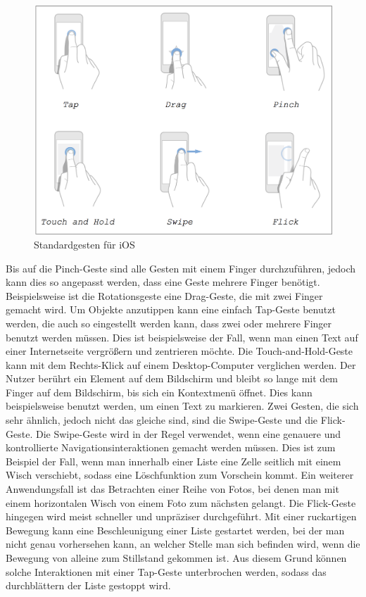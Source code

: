 \documentclass[11pt,a4paper]{report}
\begin{document}
\begin{figure}[h]
\begin{center}
\includegraphics[scale=0.31]{./images/42.png}
\caption{Standardgesten für iOS \cite{appleGesturesStandard}}
\label{applegesten}
\end{center}
\end{figure}Bis auf die Pinch-Geste sind alle Gesten mit einem Finger durchzuführen, jedoch kann dies so angepasst werden, dass eine Geste mehrere Finger benötigt. Beispielsweise ist die Rotationsgeste eine Drag-Geste, die mit zwei Finger gemacht wird. Um Objekte anzutippen kann eine einfach Tap-Geste benutzt werden, die auch so eingestellt werden kann, dass zwei oder mehrere Finger benutzt werden müssen. Dies ist beispielsweise der Fall, wenn man einen Text auf einer Internetseite vergrößern und zentrieren möchte. Die Touch-and-Hold-Geste kann mit dem Rechts-Klick auf einem Desktop-Computer verglichen werden. Der Nutzer berührt ein Element auf dem Bildschirm und bleibt so lange mit dem Finger auf dem Bildschirm, bis sich ein Kontextmenü öffnet. Dies kann beispielsweise benutzt werden, um einen Text zu markieren. Zwei Gesten, die sich sehr ähnlich, jedoch nicht das gleiche sind, sind die Swipe-Geste und die Flick-Geste. Die Swipe-Geste wird in der Regel verwendet, wenn eine genauere und kontrollierte Navigationsinteraktionen gemacht werden müssen. Dies ist zum Beispiel der Fall, wenn man innerhalb einer Liste eine Zelle seitlich mit einem Wisch verschiebt, sodass eine Löschfunktion zum Vorschein kommt. Ein weiterer Anwendungsfall ist das Betrachten einer Reihe von Fotos, bei denen man mit einem horizontalen Wisch von einem Foto zum nächsten gelangt. Die Flick-Geste hingegen wird meist schneller und unpräziser durchgeführt. Mit einer ruckartigen Bewegung kann eine Beschleunigung einer Liste gestartet werden, bei der man nicht genau vorhersehen kann, an welcher Stelle man sich befinden wird, wenn die Bewegung von alleine zum Stillstand gekommen ist. Aus diesem Grund können solche Interaktionen mit einer Tap-Geste unterbrochen werden, sodass das durchblättern der Liste gestoppt wird. \cite{appleGesturesStandard}
\end{document}
